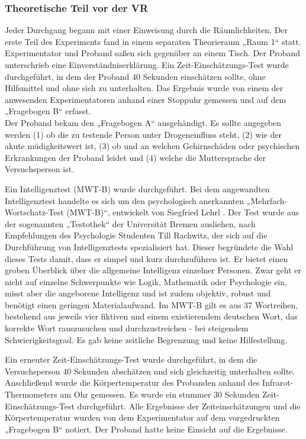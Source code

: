 \documentclass{Paper}
\begin{document}
\subsubsection{Theoretische Teil vor der VR}
Jeder Durchgang begann mit einer Einweisung durch die Räumlichkeiten. Der erste Teil des
Experiments fand in einem separaten Theorieraum „Raum 1“ statt. Experimentator und
Proband saßen sich gegenüber an einem Tisch. Der Proband unterschrieb eine
Einverständniserklärung. Ein Zeit-Einschätzungs-Test wurde durchgeführt, in dem der
Proband 40 Sekunden einschätzen sollte, ohne Hilfsmittel und ohne sich zu unterhalten.
Das Ergebnis wurde von einem der anwesenden Experimentatoren anhand einer Stoppuhr
gemessen und auf dem „Fragebogen B“ erfasst. \\
Der Proband bekam den „Fragebogen A“ ausgehändigt. Es sollte angegeben werden (1) ob die zu testende Person unter
Drogeneinfluss steht, (2) wie der akute müdigkeitswert ist, (3) ob und an welchen
Gehirnschäden oder psychischen Erkrankungen der Proband leidet und (4) welche die
Muttersprache der Versuchsperson ist. 
\par
Ein Intelligenztest (MWT-B) wurde durchgeführt. Bei
dem angewandten Intelligenztest handelte es sich um den psychologisch anerkannten
„Mehrfach-Wortschatz-Test (MWT-B)“, entwickelt von Siegfried Lehrl \cite{MWT-B}. Der Test wurde aus
der sogenannten „Testothek“ der Universität Bremen ausliehen, nach Empfehlungen des
Psychologie Studenten Till Rachwitz, der sich auf die Durchführung von Intelligenztests
spezialisiert hat. Dieser begründete die Wahl dieses Tests damit, dass er simpel und kurz
durchzuführen ist. Er bietet einen groben Überblick über die allgemeine Intelligenz
einzelner Personen. Zwar geht er nicht auf einzelne Schwerpunkte wie Logik, Mathematik
oder Psychologie ein, misst aber die angeborene Intelligenz und ist zudem objektiv, robust
und benötigt einen geringen Materialaufwand. Im MWT-B gilt es aus 37 Wortreihen,
bestehend aus jeweils vier fiktiven und einem existierendem deutschen Wort, das korrekte
Wort rauszusuchen und durchzustreichen - bei steigendem Schwierigkeitsgrad. Es gab
keine zeitliche Begrenzung und keine Hilfestellung.
\par
Ein erneuter Zeit-Einschätzungs-Test wurde durchgeführt, in dem die Versuchsperson 40 Sekunden abschätzen und sich gleichzeitig unterhalten sollte. \\
Anschließend wurde die Körpertemperatur des Probanden anhand des Infrarot-Thermometers am Ohr gemessen. Es wurde ein stummer 30 Sekunden
Zeit-Einschätzungs-Test durchgeführt. Alle Ergebnisse der Zeiteinschätzungen und die
Körpertemperatur wurden von dem Experimentator auf dem vorgedruckten „Fragebogen B“
notiert. Der Proband hatte keine Einsicht auf die Ergebnisse.
\end{document}
